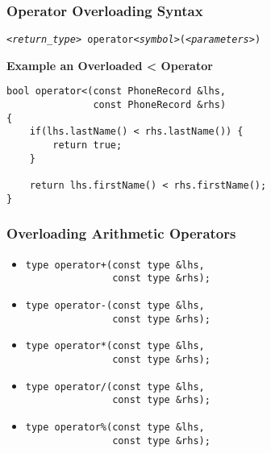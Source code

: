 \documentclass{beamer}
\begin{document}
\begin{frame}[fragile]
    \frametitle{Operator Overloading Syntax}
    {\tt {\em <return\_type>} operator{\em <symbol>}({\em <parameters>})}
    \vspace{0.25in}
    \par {\bf Example an Overloaded < Operator}
    \begin{verbatim}
bool operator<(const PhoneRecord &lhs, 
               const PhoneRecord &rhs)
{
    if(lhs.lastName() < rhs.lastName()) {
        return true;
    }
    
    return lhs.firstName() < rhs.firstName();
}
    \end{verbatim}
\end{frame}

\begin{frame}[fragile]
    \frametitle{Overloading Arithmetic Operators}
    \begin{itemize}
        \item \begin{verbatim}
type operator+(const type &lhs, 
               const type &rhs);\end{verbatim}
        \item \begin{verbatim}
type operator-(const type &lhs, 
               const type &rhs);\end{verbatim}
        \item \begin{verbatim}
type operator*(const type &lhs, 
               const type &rhs);\end{verbatim}
        \item \begin{verbatim}
type operator/(const type &lhs, 
               const type &rhs);\end{verbatim}
        \item \begin{verbatim}
type operator%(const type &lhs, 
               const type &rhs);\end{verbatim}
    \end{itemize}
\end{frame}
\end{document}
